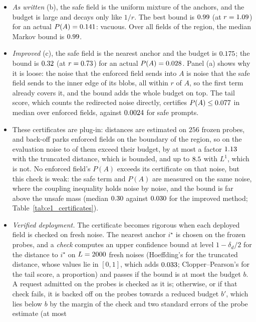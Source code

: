\documentclass{article}
\theoremstyle{plain}
\theoremstyle{remark}
\begin{document}
\begin{itemize}
\item \emph{As written} (b), the safe field is the uniform mixture of the anchors, and the budget is large and decays only
like $1/r$. The best bound is $0.99$ (at $r=1.09$) for an actual $P(A)=0.141$: vacuous. Over all fields of the region,
the median Markov bound is $0.99$.
\item \emph{Improved} (c), the safe field is the nearest anchor and the budget is $0.175$; the bound is $0.32$ (at
$r=0.73$) for an actual $P(A)=0.028$. Panel (a) shows why it is loose: the noise that the enforced field sends into $A$
is noise that the safe field sends to the inner edge of its blobs, all within $r$ of $A$, so the first term already
covers it, and the bound adds the whole budget on top. The tail score, which counts the redirected noise directly,
certifies $P(A)\le0.077$ in median over enforced fields, against $0.0024$ for safe prompts.
\item These certificates are plug-in: distances are estimated on $256$ frozen probes, and back-off parks enforced fields on the
boundary of the region, so on the evaluation noise \eoneTwoPlugMin{} to \eoneTwoPlugMax{} of them exceed their budget, by at most a factor
$1.13$ with the truncated distance, which is bounded, and up to $8.5$ with $L^1$, which is not. No enforced
field's $P(A)$ exceeds its certificate on that noise, but this check is weak: the safe term and $P(A)$ are measured on the same
noise, where the coupling inequality holds noise by noise, and the bound is far above the unsafe mass (median $0.30$
against $0.030$ for the improved method; Table~\ref{tab:e1_certificates}).
\item \emph{Verified deployment.} The certificate becomes rigorous when each deployed field is checked on fresh noise. The nearest
anchor $i^\star$ is chosen on the frozen probes, and a \emph{check} computes an upper confidence bound at level $1-\delta_d/2$ for the
distance to $i^\star$ on $L=2000$ fresh noises (Hoeffding's for the truncated distance, whose values lie in $[0,1]$, which adds
$0.033$; Clopper--Pearson's for the tail score, a proportion) and passes if the bound is at most the budget $b$. A request
admitted on the probes is checked as it is; otherwise, or if that check fails, it is backed off on the probes towards a reduced
budget $b'$, which lies below $b$ by the margin of the check and two standard errors of the probe estimate (at most

\end{itemize}
\end{document}
